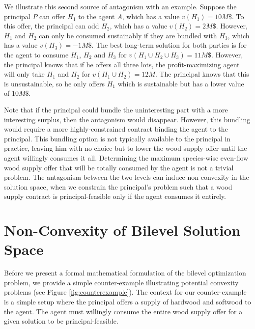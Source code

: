 We illustrate this second source of antagonism with an example. %
Suppose the principal $P$ can offer $H_1$ to the agent $A$, which has a value $v(H_1) = 10M\$$. 
To this offer, the principal can add $H_2$, which has a value $v(H_2) = 2M\$$.
However, $H_1$ and $H_2$ can only be consumed sustainably if they are bundled with $H_3$, which has a value $v(H_3) = -1M\$$. 
The best long-term solution for both parties is for the agent to consume $H_1$, $H_2$ and $H_3$ for $v(H_1 \cup H_2 \cup H_3) = 11M\$$.
However, the principal knows that if he offers all three lots, the profit-maximizing agent will only take $H_1$ and $H_2$ for $v(H_1 \cup H_2) = 12M$.
The principal knows that this is unsustainable, so he only offers $H_1$ which is sustainable but has a lower value of $10M\$$.

Note that if the principal could bundle the uninteresting part with a more interesting surplus, then the antagonism would disappear.
However, this bundling would require a more highly-constrained contract binding the agent to the principal.
This bundling option is not typically available to the principal in practice, leaving him with no choice but to lower the wood supply offer until the agent willingly consumes it all.
Determining the maximum species-wise even-flow wood supply offer that will be totally consumed by the agent is not a trivial problem.
The antagonism between the two levels can induce non-convexity in the solution space, when we constrain the principal's problem such that a wood supply contract is principal-feasible only if the agent consumes it entirely.


\section{Non-Convexity of Bilevel Solution Space} 

Before we present a formal mathematical formulation of the bilevel optimization problem, we provide a simple counter-example illustrating potential convexity problems (see Figure \ref{fig:counterexample}). The context for our counter-example is a simple setup where the principal offers a supply of hardwood and softwood to the agent. 
The agent must willingly consume the entire wood supply offer for a given solution to be principal-feasible.

